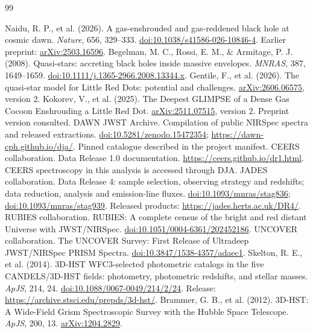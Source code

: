 \documentclass[11pt,a4paper]{article}
\begin{document}
\begin{thebibliography}{99}\small\raggedright
{} Naidu, R. P., et al. (2026). A gas-enshrouded and gas-reddened black hole at cosmic dawn. \textit{Nature}, 656, 329--333. \href{https://doi.org/10.1038/s41586-026-10846-4}{doi:10.1038/s41586-026-10846-4}. Earlier preprint: \href{https://arxiv.org/abs/2503.16596}{arXiv:2503.16596}.
 Begelman, M. C., Rossi, E. M., \& Armitage, P. J. (2008). Quasi-stars: accreting black holes inside massive envelopes. \textit{MNRAS}, 387, 1649--1659. \href{https://doi.org/10.1111/j.1365-2966.2008.13344.x}{doi:10.1111/j.1365-2966.2008.13344.x}.
 Gentile, F., et al. (2026). The quasi-star model for Little Red Dots: potential and challenges. \href{https://arxiv.org/abs/2606.06575}{arXiv:2606.06575}, version 2.
 Kokorev, V., et al. (2025). The Deepest GLIMPSE of a Dense Gas Cocoon Enshrouding a Little Red Dot. \href{https://arxiv.org/abs/2511.07515}{arXiv:2511.07515}, version 2. Preprint version consulted.
 DAWN JWST Archive. Compilation of public NIRSpec spectra and released extractions. \href{https://doi.org/10.5281/zenodo.15472354}{doi:10.5281/zenodo.15472354}; \url{https://dawn-cph.github.io/dja/}. Pinned catalogue described in the project manifest.
 CEERS collaboration. Data Release 1.0 documentation. \url{https://ceers.github.io/dr1.html}. CEERS spectroscopy in this analysis is accessed through DJA.
 JADES collaboration. Data Release 4: sample selection, observing strategy and redshifts; data reduction, analysis and emission-line fluxes. \href{https://doi.org/10.1093/mnras/stag836}{doi:10.1093/mnras/stag836}; \href{https://doi.org/10.1093/mnras/stag939}{doi:10.1093/mnras/stag939}. Released products: \url{https://jades.herts.ac.uk/DR4/}.
 RUBIES collaboration. RUBIES: A complete census of the bright and red distant Universe with JWST/NIRSpec. \href{https://doi.org/10.1051/0004-6361/202452186}{doi:10.1051/0004-6361/202452186}.
 UNCOVER collaboration. The UNCOVER Survey: First Release of Ultradeep JWST/NIRSpec PRISM Spectra. \href{https://doi.org/10.3847/1538-4357/adaec1}{doi:10.3847/1538-4357/adaec1}.
 Skelton, R. E., et al. (2014). 3D-HST WFC3-selected photometric catalogs in the five CANDELS/3D-HST fields: photometry, photometric redshifts, and stellar masses. \textit{ApJS}, 214, 24. \href{https://doi.org/10.1088/0067-0049/214/2/24}{doi:10.1088/0067-0049/214/2/24}. Release: \url{https://archive.stsci.edu/prepds/3d-hst/}.
 Brammer, G. B., et al. (2012). 3D-HST: A Wide-Field Grism Spectroscopic Survey with the Hubble Space Telescope. \textit{ApJS}, 200, 13. \href{https://arxiv.org/abs/1204.2829}{arXiv:1204.2829}.

\end{thebibliography}
\end{document}

